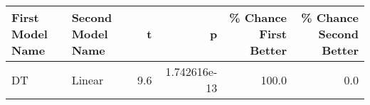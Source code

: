 \begin{tabular}{llrrrr}
\toprule
First Model Name & Second Model Name &   t &            p &  \% Chance First Better &  \% Chance Second Better \\
\midrule
              DT &            Linear & 9.6 & 1.742616e-13 &                  100.0 &                     0.0 \\
\bottomrule
\end{tabular}
